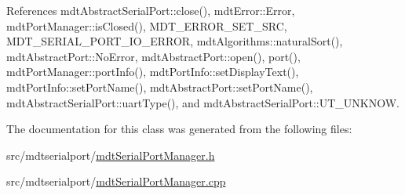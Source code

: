 References mdt\-Abstract\-Serial\-Port\-::close(), mdt\-Error\-::\-Error, mdt\-Port\-Manager\-::is\-Closed(), M\-D\-T\-\_\-\-E\-R\-R\-O\-R\-\_\-\-S\-E\-T\-\_\-\-S\-R\-C, M\-D\-T\-\_\-\-S\-E\-R\-I\-A\-L\-\_\-\-P\-O\-R\-T\-\_\-\-I\-O\-\_\-\-E\-R\-R\-O\-R, mdt\-Algorithms\-::natural\-Sort(), mdt\-Abstract\-Port\-::\-No\-Error, mdt\-Abstract\-Port\-::open(), port(), mdt\-Port\-Manager\-::port\-Info(), mdt\-Port\-Info\-::set\-Display\-Text(), mdt\-Port\-Info\-::set\-Port\-Name(), mdt\-Abstract\-Port\-::set\-Port\-Name(), mdt\-Abstract\-Serial\-Port\-::uart\-Type(), and mdt\-Abstract\-Serial\-Port\-::\-U\-T\-\_\-\-U\-N\-K\-N\-O\-W.



The documentation for this class was generated from the following files\-:\begin{DoxyCompactItemize}
\item 
src/mdtserialport/\hyperlink{mdt_serial_port_manager_8h}{mdt\-Serial\-Port\-Manager.\-h}\item 
src/mdtserialport/\hyperlink{mdt_serial_port_manager_8cpp}{mdt\-Serial\-Port\-Manager.\-cpp}\end{DoxyCompactItemize}

